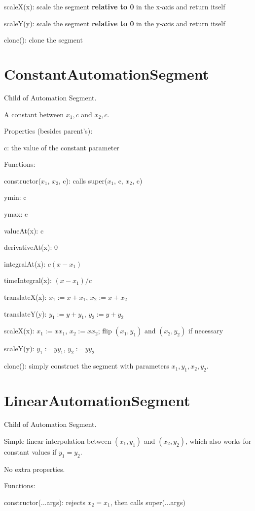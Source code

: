 \documentclass{article}
\begin{document}
scaleX(x): scale the segment \textbf{relative to 0} in the x-axis and return itself

scaleY(y): scale the segment \textbf{relative to 0} in the y-axis and return itself

clone(): clone the segment


\section{ConstantAutomationSegment}

Child of Automation Segment.

A constant between $x_1, c$ and $x_2, c$.

Properties (besides parent's):

c: the value of the constant parameter

Functions:

constructor($x_1$, $x_2$, c): calls super($x_1$, c, $x_2$, c)

ymin: c

ymax: c

valueAt(x): c

derivativeAt(x): 0

integralAt(x): $c(x-x_1)$

timeIntegral(x): $(x-x_1)/c$

translateX(x): $x_1:=x+x_1$, $x_2:=x+x_2$

translateY(y): $y_1:=y+y_1$, $y_2:=y+y_2$

scaleX(x): $x_1:=xx_1$, $x_2:=xx_2$; flip $(x_1, y_1)$ and $(x_2, y_2)$ if necessary

scaleY(y): $y_1:=yy_1$, $y_2:=yy_2$

clone(): simply construct the segment with parameters $x_1, y_1, x_2, y_2$.

\section{LinearAutomationSegment}

Child of Automation Segment.

Simple linear interpolation between $(x_1, y_1)$ and $(x_2, y_2)$, which also works for constant values if $y_1=y_2$.

No extra properties.

Functions:

constructor(...args): rejects $x_2 = x_1$, then calls super(...args)
\end{document}
